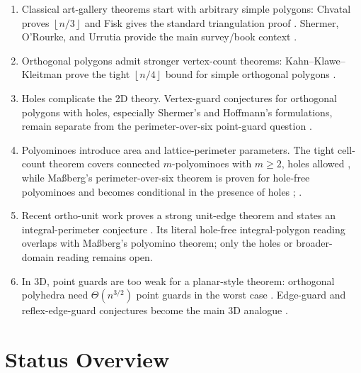 \documentclass[11pt]{article}
\newcommand{\floor}[1]{\left\lfloor #1 \right\rfloor}
\begin{document}
\begin{enumerate}
  \item Classical art-gallery theorems start with arbitrary simple polygons:
  Chvatal proves $\floor{n/3}$ and Fisk gives the standard triangulation proof
  \cite{Chvatal1975,Fisk1978}.  Shermer, O'Rourke, and Urrutia provide the
  main survey/book context \cite{Shermer1992,ORourke1987,Urrutia2000}.

  \item Orthogonal polygons admit stronger vertex-count theorems:
  Kahn--Klawe--Kleitman prove the tight $\floor{n/4}$ bound for simple
  orthogonal polygons \cite{KahnKlaweKleitman1983}.

  \item Holes complicate the 2D theory.  Vertex-guard conjectures for
  orthogonal polygons with holes, especially Shermer's and Hoffmann's
  formulations, remain separate from the perimeter-over-six point-guard
  question \cite{UrrutiaOpenProblems,HoffmannKriegel1996,Zylinski2006,MichaelPinciu2016}.

  \item Polyominoes introduce area and lattice-perimeter parameters.  The
  tight cell-count theorem covers connected $m$-polyominoes with $m\geq 2$,
  holes allowed \cite[Cor.~1]{BiedlEtAl2012}, while Ma{\ss}berg's
  perimeter-over-six theorem is proven for hole-free polyominoes and becomes
  conditional in the presence of holes
  \cite[Theorem~1]{Massberg2014}; \cite[Thm.~6.3 and
  Conj.~6.10]{MassbergHabilitation}.

  \item Recent ortho-unit work proves a strong unit-edge theorem and states
  an integral-perimeter conjecture \cite{DiazBanezEtAl2025}.  Its literal
  hole-free integral-polygon reading overlaps with Ma{\ss}berg's polyomino
  theorem; only the holes or broader-domain reading remains open.

  \item In 3D, point guards are too weak for a planar-style theorem:
  orthogonal polyhedra need $\Theta(n^{3/2})$ point guards in the worst case
  \cite{PatersonYao1992,VigliettaThesis}.  Edge-guard and reflex-edge-guard
  conjectures become the main 3D analogue \cite{BenbernouEtAl2011,Viglietta2020,CanoTothUrrutiaViglietta2022}.
\end{enumerate}

\section{Status Overview}
\end{document}
